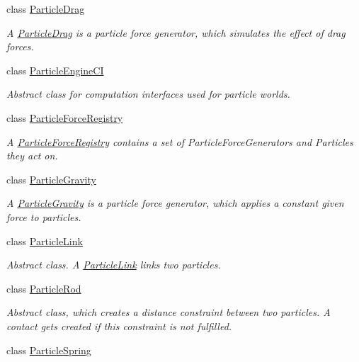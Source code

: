 \begin{DoxyCompactItemize}
class \mbox{\hyperlink{classr3_1_1_particle_drag}{Particle\+Drag}}
\begin{DoxyCompactList}\small\item\em A \mbox{\hyperlink{classr3_1_1_particle_drag}{Particle\+Drag}} is a particle force generator, which simulates the effect of drag forces. \end{DoxyCompactList}\item 
class \mbox{\hyperlink{classr3_1_1_particle_engine_c_i}{Particle\+Engine\+CI}}
\begin{DoxyCompactList}\small\item\em Abstract class for computation interfaces used for particle worlds. \end{DoxyCompactList}\item 
class \mbox{\hyperlink{classr3_1_1_particle_force_registry}{Particle\+Force\+Registry}}
\begin{DoxyCompactList}\small\item\em A \mbox{\hyperlink{classr3_1_1_particle_force_registry}{Particle\+Force\+Registry}} contains a set of Particle\+Force\+Generators and Particles they act on. \end{DoxyCompactList}\item 
class \mbox{\hyperlink{classr3_1_1_particle_gravity}{Particle\+Gravity}}
\begin{DoxyCompactList}\small\item\em A \mbox{\hyperlink{classr3_1_1_particle_gravity}{Particle\+Gravity}} is a particle force generator, which applies a constant given force to particles. \end{DoxyCompactList}\item 
class \mbox{\hyperlink{classr3_1_1_particle_link}{Particle\+Link}}
\begin{DoxyCompactList}\small\item\em Abstract class. A \mbox{\hyperlink{classr3_1_1_particle_link}{Particle\+Link}} links two particles. \end{DoxyCompactList}\item 
class \mbox{\hyperlink{classr3_1_1_particle_rod}{Particle\+Rod}}
\begin{DoxyCompactList}\small\item\em Abstract class, which creates a distance constraint between two particles. A contact gets created if this constraint is not fulfilled. \end{DoxyCompactList}\item 
class \mbox{\hyperlink{classr3_1_1_particle_spring}{Particle\+Spring}}

\end{DoxyCompactItemize}
